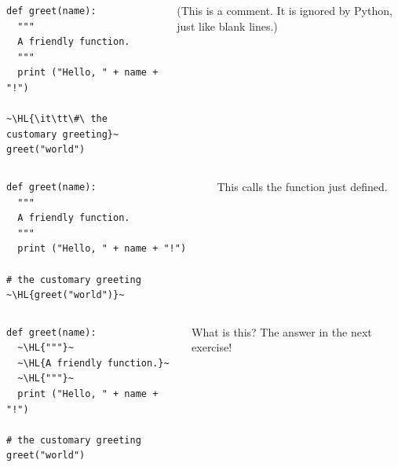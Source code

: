 \documentclass[english,serif,mathserif,xcolor=pdftex,dvipsnames,table]{beamer}
\begin{document}
\begin{frame}[fragile]
  \begin{columns}[t]
    \begin{column}{0.5\textwidth}
\begin{lstlisting}
def greet(name):
  """
  A friendly function.
  """
  print ("Hello, " + name + "!")

~\HL{\it\tt\#\ the customary greeting}~
greet("world")
\end{lstlisting}
    \end{column}
    \begin{column}{0.5\textwidth}
      \raggedleft
      (This is a comment. It is ignored by Python, just like blank lines.)
    \end{column}
  \end{columns}
\end{frame}

\begin{frame}[fragile]
  \begin{columns}[t]
    \begin{column}{0.5\textwidth}
\begin{lstlisting}
def greet(name):
  """
  A friendly function.
  """
  print ("Hello, " + name + "!")

# the customary greeting
~\HL{greet("world")}~
\end{lstlisting}
    \end{column}
    \begin{column}{0.5\textwidth}
      \raggedleft
      This calls the function just defined.
    \end{column}
  \end{columns}
\end{frame}

\begin{frame}[fragile]
  \begin{columns}[t]
    \begin{column}{0.5\textwidth}
\begin{lstlisting}
def greet(name):
  ~\HL{"""}~
  ~\HL{A friendly function.}~
  ~\HL{"""}~
  print ("Hello, " + name + "!")

# the customary greeting
greet("world")
\end{lstlisting}
    \end{column}
    \begin{column}{0.5\textwidth}
      \raggedleft
      What is this? The answer in the next exercise!
    \end{column}
  \end{columns}
\end{frame}
\end{document}
